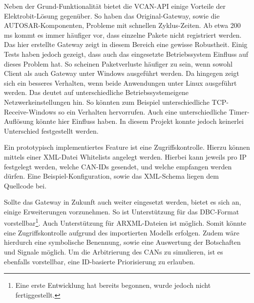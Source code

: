 \documentclass[
  a4paper,					    %
  twoside,
  DIV=calc,     				%
  bibliography=totoc,
  cleardoublepage=empty,
  ngerman,     					%
  final       					%
]{scrbook}
\begin{document}
Neben der Grund-Funktionalität bietet die VCAN-API einige Vorteile der Elektrobit-Lösung gegenüber. So haben das Original-Gateway, sowie die AUTOSAR-Komponenten, Probleme mit schnellen Zyklus-Zeiten. Ab etwa 200 ms kommt es immer häufiger vor, dass einzelne Pakete nicht registriert werden. Das hier erstellte Gateway zeigt in diesem Bereich eine gewisse Robustheit. Einig Tests haben jedoch gezeigt, dass auch das eingesetzte Betriebssystem Einfluss auf dieses Problem hat. So scheinen Paketverluste häufiger zu sein, wenn sowohl Client als auch Gateway unter Windows ausgeführt werden. Da hingegen zeigt sich ein besseres Verhalten, wenn beide Anwendungen unter Linux ausgeführt werden. Das deutet auf unterschiedliche Betriebssystemeigene Netzwerkeinstellungen hin. So könnten zum Beispiel unterschiedliche TCP-Receive-Windows so ein Verhalten hervorrufen. Auch eine unterschiedliche Timer-Auflösung könnte hier Einfluss haben. In diesem Projekt konnte jedoch keinerlei Unterschied festgestellt werden.

Ein prototypisch implementiertes Feature ist eine Zugriffskontrolle. Hierzu können mittels einer XML-Datei Whitelists angelegt werden. Hierbei kann jeweils pro IP festgelegt werden, welche CAN-IDs gesendet, und welche empfangen werden dürfen. Eine Beispiel-Konfiguration, sowie das XML-Schema liegen dem Quellcode bei.

Sollte das Gateway in Zukunft auch weiter eingesetzt werden, bietet es sich an, einige Erweiterungen vorzunehmen. So ist Unterstützung für das DBC-Format vorstellbar\footnote{Eine erste Entwicklung hat bereits begonnen, wurde jedoch nicht fertiggestellt.}. Auch Unterstützung für ARXML-Dateien ist möglich. Somit könnte eine Zugriffskontrolle aufgrund des importierten Modells erfolgen. Zudem wäre hierdurch eine symbolische Benennung, sowie eine Auswertung der Botschaften und Signale möglich. Um die Arbitrierung des CANs zu simulieren, ist es ebenfalls vorstellbar, eine ID-basierte Priorisierung zu erlauben.
\end{document}
